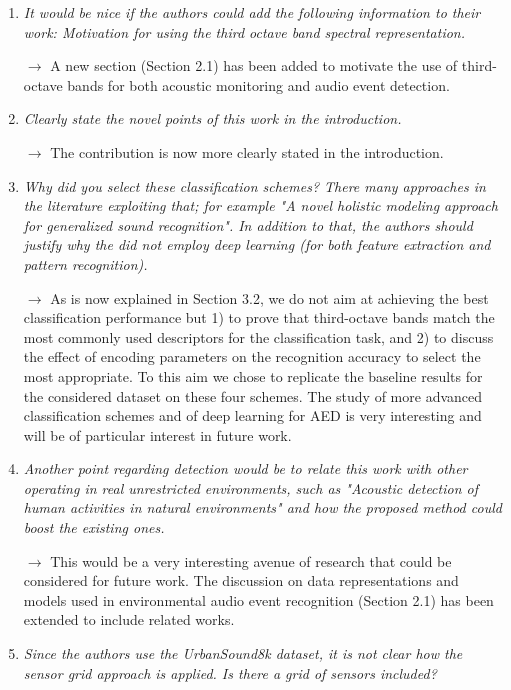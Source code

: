 \documentclass[10pt]{article}
\begin{document}
\begin{enumerate}

\item \emph{It would be nice if the authors could add the following information to their work: Motivation for using the third octave band spectral representation.}

$\rightarrow$ A new section (Section 2.1) has been added to motivate the use of third-octave bands for both acoustic monitoring and audio event detection.

\item \emph{Clearly state the novel points of this work in the introduction.}

$\rightarrow$ The contribution is now more clearly stated in the introduction.

\item \emph{Why did you select these classification schemes? There many approaches in the literature exploiting that; for example "A novel holistic modeling approach for generalized sound recognition". In addition to that, the authors should justify why the did not employ deep learning (for both feature extraction and pattern recognition).}

$\rightarrow$ As is now explained in Section 3.2, we do not aim at achieving the best classification performance but 1) to prove that third-octave bands match the most commonly used descriptors for the classification task, and 2) to discuss the effect of encoding parameters on the recognition accuracy to select the most appropriate. To this aim we chose to replicate the baseline results for the considered dataset on these four schemes.
The study of more advanced classification schemes and of deep learning for AED is very interesting and will be of particular interest in future work.

\item \emph{Another point regarding detection would be to relate this work with other operating in real unrestricted environments, such as "Acoustic detection of human activities in natural environments" and how the proposed method could boost the existing ones.}

$\rightarrow$ This would be a very interesting avenue of research that could be considered for future work. The discussion on data representations and models used in environmental audio event recognition (Section 2.1) has been extended to include related works.

\item \emph{Since the authors use the UrbanSound8k dataset, it is not clear how the sensor grid approach is applied. Is there a grid of sensors included?}


\end{enumerate}
\end{document}
